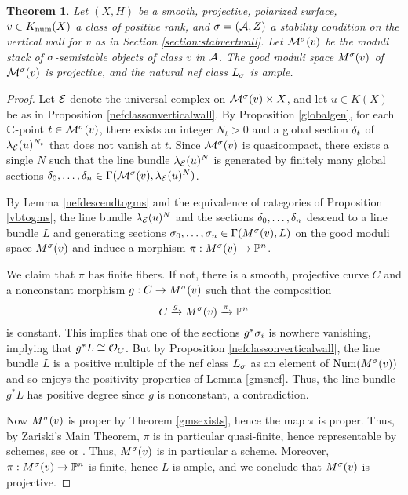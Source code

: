\documentclass[letterpaper,12pt]{amsart}
\newtheorem{thm}{Theorem}[section]
\theoremstyle{remark}
\begin{document}
\begin{thm}\label{projectivity}
    Let $(X, H)$ be a smooth, projective, polarized surface, $v \in K_{\mathrm{num}}(X)$ a class of positive rank, and $\sigma = (\mathcal{A}, Z)$ a stability condition on the vertical wall for $v$ as in Section \ref{section:stabvertwall}. Let $\mathcal{M}^\sigma(v)$ be the moduli stack of $\sigma$-semistable objects of class $v$ in $\mathcal{A}$. The good moduli space $M^\sigma(v)$ of $\mathcal{M}^\sigma(v)$ is projective, and the natural nef class $L_\sigma$ is ample.
\end{thm}
\begin{proof}
    Let $\mathcal{E}$ denote the universal complex on $\mathcal{M}^\sigma(v) \times X$, and let $u \in K(X)$ be as in Proposition \ref{nefclassonverticalwall}. By Proposition \ref{globalgen}, for each $\mathbb{C}$-point $t \in \mathcal{M}^\sigma(v)$, there exists an integer $N_t > 0$ and a global section $\delta_t$ of $\lambda_{\mathcal{E}}(u)^{N_t}$ that does not vanish at $t$. Since $\mathcal{M}^\sigma(v)$ is quasicompact, there exists a single $N$ such that the line bundle $\lambda_{\mathcal{E}}(u)^N$ is generated by finitely many global sections $\delta_0,\ldots,\delta_n \in \Gamma(\mathcal{M}^\sigma(v), \lambda_{\mathcal{E}}(u)^N)$. 
    
    By Lemma \ref{nefdescendtogms} and the equivalence of categories of Proposition \ref{vbtogms}, the line bundle $\lambda_{\mathcal{E}}(u)^N$ and the sections $\delta_0,\ldots,\delta_n$ descend to a line bundle $L$ and generating sections $\sigma_0,\ldots,\sigma_n \in \Gamma(M^\sigma(v), L)$ on the good moduli space $M^\sigma(v)$ and induce a morphism $\pi: M^\sigma(v) \to \mathbb{P}^n$.
    
    We claim that $\pi$ has finite fibers. If not, there is a smooth, projective curve $C$ and a nonconstant morphism $g: C \to M^\sigma(v)$ such that the composition 
    \[ C \xrightarrow{g} M^\sigma(v) \xrightarrow{\pi} \mathbb{P}^n \]
    is constant. This implies that one of the sections $g^*\sigma_i$ is nowhere vanishing, implying that $g^*L \cong \mathcal{O}_C$. But by Proposition \ref{nefclassonverticalwall}, the line bundle $L$ is a positive multiple of the nef class $L_\sigma$ as an element of $\mathrm{Num}(M^\sigma(v))$ and so enjoys the positivity properties of Lemma \ref{gmsnef}. Thus, the line bundle $g^*L$ has positive degree since $g$ is nonconstant, a contradiction.
    
    Now $M^\sigma(v)$ is proper by Theorem \ref{gmsexists}, hence the map $\pi$ is proper. Thus, by Zariski's Main Theorem, $\pi$ is in particular quasi-finite, hence representable by schemes, see \cite[Chapter II, Theorem 6.15]{knutson} or \cite[\href{https://stacks.math.columbia.edu/tag/082J}{Tag 082J}]{stacks-project}. Thus, $M^\sigma(v)$ is in particular a scheme. Moreover, $\pi: M^\sigma(v) \to \mathbb{P}^n$ is finite, hence $L$ is ample, and we conclude that $M^\sigma(v)$ is projective.
\end{proof}
\end{document}
